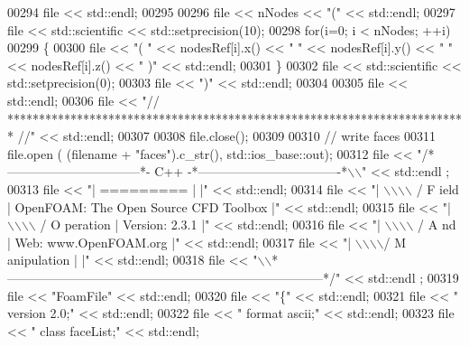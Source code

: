 \begin{DoxyCode}
00294     file << std::endl;
00295 
00296     file << nNodes << \textcolor{stringliteral}{"("} << std::endl;
00297     file << std::scientific << std::setprecision(10);
00298     \textcolor{keywordflow}{for}(i=0; i < nNodes; ++i)
00299     \{
00300         file << \textcolor{stringliteral}{"( "} << nodesRef[i].x() << \textcolor{stringliteral}{" "} << nodesRef[i].y() << \textcolor{stringliteral}{" "} << nodesRef[i].z() << \textcolor{stringliteral}{" )"} << 
      std::endl;
00301     \}
00302     file << std::scientific << std::setprecision(0);
00303     file << \textcolor{stringliteral}{")"} << std::endl;
00304 
00305     file << std::endl;
00306     file << \textcolor{stringliteral}{"// ************************************************************************* //"} << std::endl;
00307 
00308     file.close();
00309 
00310     \textcolor{comment}{// write faces}
00311     file.open ( (filename + \textcolor{stringliteral}{"faces"}).c\_str(), std::ios\_base::out);
00312     file << \textcolor{stringliteral}{"/*--------------------------------*- C++ -*----------------------------------*\(\backslash\)\(\backslash\)"} << std::endl
      ;
00313     file << \textcolor{stringliteral}{"| =========                 |                                                 |"} << std::endl;
00314     file << \textcolor{stringliteral}{"| \(\backslash\)\(\backslash\)\(\backslash\)\(\backslash\)      /  F ield         | OpenFOAM: The Open Source CFD Toolbox           |"} << 
      std::endl;
00315     file << \textcolor{stringliteral}{"|  \(\backslash\)\(\backslash\)\(\backslash\)\(\backslash\)    /   O peration     | Version:  2.3.1                                 |"} << 
      std::endl;
00316     file << \textcolor{stringliteral}{"|   \(\backslash\)\(\backslash\)\(\backslash\)\(\backslash\)  /    A nd           | Web:      www.OpenFOAM.org                      |"} << 
      std::endl;
00317     file << \textcolor{stringliteral}{"|    \(\backslash\)\(\backslash\)\(\backslash\)\(\backslash\)/     M anipulation  |                                                 |"} << 
      std::endl;
00318     file << \textcolor{stringliteral}{"\(\backslash\)\(\backslash\)*---------------------------------------------------------------------------*/"} << std::endl
      ;
00319     file << \textcolor{stringliteral}{"FoamFile"} << std::endl;
00320     file << \textcolor{stringliteral}{"\{"} << std::endl;
00321     file << \textcolor{stringliteral}{"    version     2.0;"} << std::endl;
00322     file << \textcolor{stringliteral}{"    format      ascii;"} << std::endl;
00323     file << \textcolor{stringliteral}{"    class       faceList;"} << std::endl;

\end{DoxyCode}
